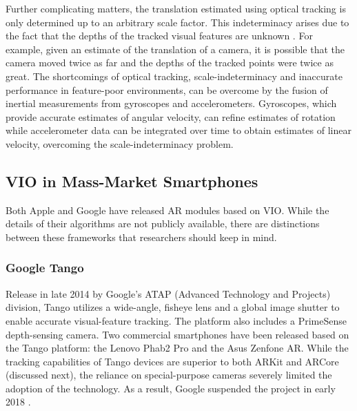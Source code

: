 \documentclass[chi]{sigchi}
\begin{document}
Further complicating matters, the translation estimated using optical tracking is only determined up to an arbitrary scale factor.  This indeterminacy arises due to the fact that the depths of the tracked visual features are unknown \cite{Hartley2004}.  For example, given an estimate of the translation of a camera, it is possible that the camera moved twice as far and the depths of the tracked points were twice as great.  The shortcomings of optical tracking, scale-indeterminacy and inaccurate performance in feature-poor environments, can be overcome by the fusion of inertial measurements from gyroscopes and accelerometers.  Gyroscopes, which provide accurate estimates of angular velocity, can refine estimates of rotation while accelerometer data can be integrated over time to obtain estimates of linear velocity, overcoming the scale-indeterminacy problem.

\subsection{VIO in Mass-Market Smartphones}
Both Apple and Google have released AR modules based on VIO.  While the details of their algorithms are not publicly available, there are distinctions between these frameworks that researchers should keep in mind.

\subsubsection{Google Tango}
Release in late 2014 by Google's ATAP (Advanced Technology and Projects) division, Tango utilizes a wide-angle, fisheye lens and a global image shutter to enable accurate visual-feature tracking.  The platform also includes a PrimeSense depth-sensing camera.  Two commercial smartphones have been released based on the Tango platform: the Lenovo Phab2 Pro and the Asus Zenfone AR.  While the tracking capabilities of Tango devices are superior to both ARKit and ARCore (discussed next), the reliance on special-purpose cameras severely limited the adoption of the technology.  As a result, Google suspended the project in early 2018 \cite{tangoretired}.
\end{document}
